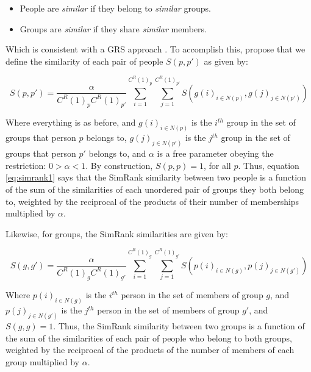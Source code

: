\documentclass[a4paper,fleqn]{cas-sc}
\begin{document}
\begin{itemize}
    \item People are \textit{similar} if they belong to \textit{similar} groups.
    \item Groups are \textit{similar} if they share \textit{similar} members.
\end{itemize}

Which is consistent with a GRS approach \citep[see][]{kovacs2010generalized, lizardo2024two}. To accomplish this, \citet[540, eq. 2 and eq. 3]{jeh2002simrank} propose that we define the similarity of each pair of people $S(p, p')$  as given by:

\begin{equation}
    S(p, p') = \frac{\alpha}{C^R(1)_pC^R(1)_{p'}}
    \sum_{i = 1}^{C^R(1)_p} \sum_{j = 1}^{C^R(1)_{p'}} 
    S\left(g(i)_{i \in N(p)}, g(j)_{j \in N(p')}\right)
    \label{eq:simrank1}
\end{equation}

Where everything is as before, and $g(i)_{i \in N(p)}$ is the $i^{th}$ group in the set of groups that person $p$ belongs to, $g(j)_{j \in N(p')}$ is the $j^{th}$ group in the set of groups that person $p'$ belongs to, and $\alpha$ is a free parameter obeying the restriction: $0 > \alpha < 1$. By construction, $S(p, p) = 1$, for all $p$. Thus, equation \ref{eq:simrank1} says that the SimRank similarity between two people is a function of the sum of the similarities of each unordered pair of groups they both belong to, weighted by the reciprocal of the products of their number of memberships multiplied by $\alpha$.

Likewise, for groups, the SimRank similarities are given by:

\begin{equation}
    S(g, g') = \frac{\alpha}{C^R(1)_gC^R(1)_{g'}}
    \sum_{i = 1}^{C^R(1)_g} \sum_{j = 1}^{C^R(1)_{g'}} 
    S\left(p(i)_{i \in N(g)}, p(j)_{j \in N(g')}\right)
    \label{eq:simrank2}
\end{equation}

Where $p(i)_{i \in N(g)}$ is the $i^{th}$ person in the set of members of group $g$, and $p(j)_{j \in N(g')}$ is the $j^{th}$ person in the set of members of group $g'$, and $S(g, g) = 1$. Thus, the SimRank similarity between two groups is a function of the sum of the similarities of each pair of people who belong to both groups, weighted by the reciprocal of the products of the number of members of each group multiplied by $\alpha$.
\end{document}
